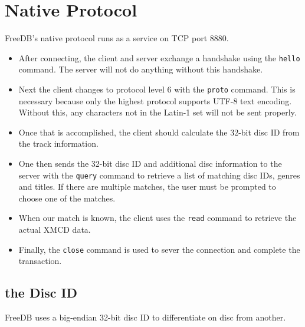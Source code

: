\section{Native Protocol}
FreeDB's native protocol runs as a service on TCP port 8880.
\begin{itemize}
\item After connecting, the client and server exchange a handshake using
the \texttt{hello} command.
The server will not do anything without this handshake.

\item Next the client changes to protocol level 6 with
the \texttt{proto} command.
This is necessary because only the highest protocol supports
UTF-8 text encoding.
Without this, any characters not in the Latin-1 set will not be
sent properly.

\item Once that is accomplished, the client should calculate the 32-bit
disc ID from the track information.

\item One then sends the 32-bit disc ID and additional disc information
to the server with the \texttt{query} command to retrieve a list of
matching disc IDs, genres and titles.
If there are multiple matches, the user must be prompted to
choose one of the matches.

\item When our match is known, the client uses the \texttt{read} command
to retrieve the actual XMCD data.

\item Finally, the \texttt{close} command is used to sever the connection
and complete the transaction.
\end{itemize}

\pagebreak

\subsection{the Disc ID}
\label{freedb:discid}
FreeDB uses a big-endian 32-bit disc ID to differentiate
on disc from another.

